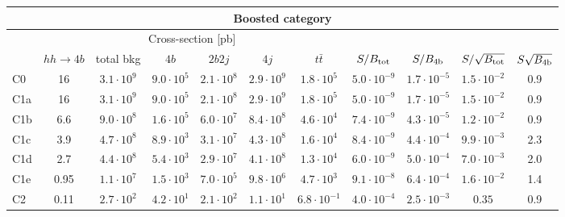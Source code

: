 \begin{tabular}{|l|cc|cccc|cccc|}
  \hline
\multicolumn{11}{|c|}{Boosted category}\\
\hline
&  \multicolumn{6}{c|}{Cross-section [pb]} &  &  & &  \\
   &  $hh\to 4b$ &  total bkg  &   $4b$    &  $2b2j$   &   $4j$    &
$t\bar{t}$ &
$S/B_{\rm tot}$ & $S/B_{\rm 4b}$ & $S/\sqrt{B_{\rm tot}}$ & $S\sqrt{B_{\rm 4b}}$ \\
  \hline
  \hline
 C0      & 16  &   $3.1\cdot 10^9$   & $9.0\cdot 10^5$ & $2.1\cdot 10^8$ & $2.9\cdot 10^9$ & $1.8\cdot 10^5$ &   $5.0\cdot 10^{-9}$   & $1.7\cdot 10^{-5}$  &   $1.5\cdot 10^{-2}$   & 0.9 \\
 C1a     & 16  &   $3.1\cdot 10^9 $  & $9.0\cdot 10^5$ & $2.1\cdot 10^8$ & $2.9\cdot 10^9$ & $1.8\cdot 10^5$ &   $5.0\cdot 10^{-9}$   & $1.7\cdot 10^{-5}$   &   $1.5\cdot 10^{-2}$   & 0.9 \\
 C1b     & 6.6  &   $9.0\cdot 10^8 $  & $1.6\cdot 10^5$ & $6.0\cdot 10^7$ & $8.4\cdot 10^8$ & $4.6\cdot 10^4$ &   $7.4\cdot 10^{-9}$   & $4.3\cdot 10^{-5}$   &   $1.2\cdot 10^{-2}$   & 0.9 \\
 C1c     & 3.9  &   $4.7\cdot 10^8 $  & $8.9\cdot 10^3$ & $3.1\cdot 10^7$ & $4.3\cdot 10^8$ & $1.6\cdot 10^4$   &  $ 8.4\cdot 10^{-9}$   & $4.4\cdot 10^{-4}$  &  $ 9.9\cdot 10^{-3}$   & 2.3 \\
 C1d     & 2.7  &   $4.4\cdot 10^8 $  & $5.4\cdot 10^3$ & $2.9\cdot 10^7$ & $4.1\cdot 10^8$ & $1.3\cdot 10^4$ &   $6.0\cdot 10^{-9}$   & $5.0\cdot 10^{-4}$  &   $7.0\cdot 10^{-3}$   & 2.0 \\
 C1e     & 0.95  &   $1.1\cdot 10^7$   & $1.5\cdot 10^3$ & $7.0\cdot 10^5$ & $9.8\cdot 10^6$ & $4.7\cdot 10^3$  &  $ 9.1\cdot 10^{-8}$   & $6.4\cdot 10^{-4}$  &   $1.6\cdot 10^{-2}$   & 1.4 \\
 C2      & 0.11  &   $2.7\cdot 10^2$   & $4.2\cdot 10^1$ & $2.1\cdot 10^2$ & $1.1\cdot 10^1$ & $6.8\cdot 10^{-1}$  &  $ 4.0\cdot 10^{-4}$   & $2.5\cdot 10^{-3}$  &   $0.35$   & 0.9 \\
\hline
\end{tabular}
